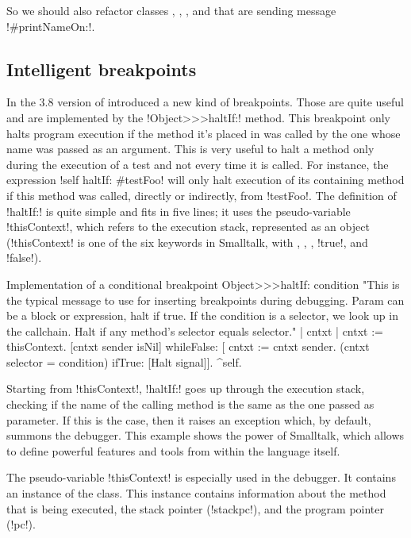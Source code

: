 \documentclass[a4paper,10pt,twoside]{book}
\begin{document}
So we should also refactor classes , , , and  that are sending message \ct!#printNameOn:!.

\subsection{Intelligent breakpoints}

In the 3.8 version of \squeak introduced a new kind of breakpoints.
Those are quite useful and are implemented by the \ct!Object>>>haltIf:! method.
This breakpoint only halts program execution if the method it's placed in was called by the one whose name was passed as an argument.
This is very useful to halt a method only during the execution of a test and not every time it is called.
For instance, the expression \ct!self haltIf: #testFoo! will only halt execution of its containing method if this method was called, directly or indirectly, from \ct!testFoo!.
The definition of \ct!haltIf:! is quite simple and fits in five lines; it uses the pseudo-variable \ct!thisContext!, which refers to the execution stack, represented as an object (\ct!thisContext! is one of the six keywords in Smalltalk, with \self, \super, \nil, \ct!true!, and \ct!false!).

\begin{method}[objecthaltif]{Implementation of a conditional breakpoint}
Object>>>haltIf: condition
	"This is the typical message to use for inserting breakpoints during debugging. Param can be a block or expression, halt if true.
	If the condition is a selector, we look up in the callchain. Halt if any method's selector equals selector."
	| cntxt |
	cntxt := thisContext.
	[cntxt sender isNil] whileFalse: [
		cntxt := cntxt sender.
		(cntxt selector = condition) ifTrue: [Halt signal]].
	^self.
\end{method}

Starting from \ct!thisContext!, \ct!haltIf:! goes up through the execution stack, checking if the name of the calling method is the same as the one passed as parameter.
If this is the case, then it raises an exception which, by default, summons the debugger.
This example shows the power of Smalltalk, which allows to define powerful features and tools from within the language itself.

The pseudo-variable \ct!thisContext! is especially used in the \squeak debugger.
It contains an instance of the  class.
This instance contains information about the method that is being executed, the stack pointer (\ct!stackpc!), and the program pointer (\ct!pc!).
\end{document}
